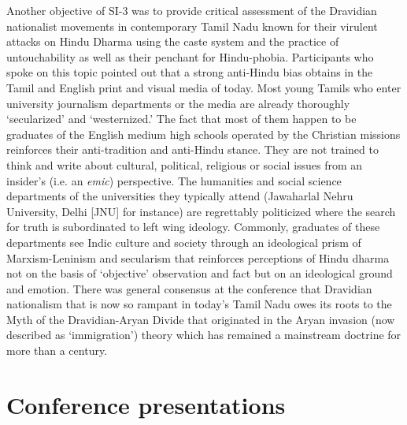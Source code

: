 \vskip 7pt

Another objective of SI-3 was to provide critical assessment of the Dravidian nationalist movements in contemporary Tamil Nadu known for their virulent attacks on Hindu Dharma using the caste system and the practice of untouchability as well as their penchant for Hindu-phobia. Participants who spoke on this topic pointed out that a strong anti-Hindu bias obtains in the Tamil and English print and visual media of today. Most young Tamils who enter university journalism departments or the media are already thoroughly ‘secularized’ and ‘westernized.’ The fact that most of them happen to be graduates of the English medium high schools operated by the Christian missions reinforces their anti-tradition and anti-Hindu stance. They are not trained to think and write about cultural, political, religious or social issues from an insider’s (i.e. an \textit{emic}) perspective. The humanities and social science departments of the universities they typically attend (Jawaharlal Nehru University, Delhi [JNU] for instance) are regrettably politicized where the search for truth is subordinated to left wing ideology. Commonly, graduates of these departments see Indic culture and society through an ideological prism of Marxism-Leninism and secularism that reinforces perceptions of Hindu dharma not on the basis of ‘objective’ observation and fact but on an ideological ground and emotion. There was general consensus at the conference that Dravidian nationalism that is now so rampant in today’s Tamil Nadu owes its roots to the Myth of the Dravidian-Aryan Divide that originated in the Aryan invasion (now described as ‘immigration’) theory which has remained a mainstream doctrine for more than a century.


\section*{Conference presentations}

